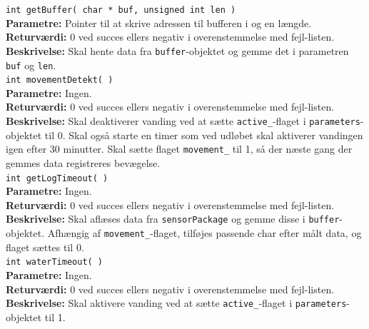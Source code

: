 \verb+int getBuffer( char * buf, unsigned int len )+ \\
\textbf{Parametre:} Pointer til at skrive adressen til bufferen i og en længde. \\
\textbf{Returværdi:} 0 ved succes ellers negativ i overenstemmelse med fejl-listen. \\
\textbf{Beskrivelse:} Skal hente data fra \verb+buffer+-objektet og gemme det i parametren \verb+buf+ og \verb+len+. \\

\verb+int movementDetekt( )+ \\
\textbf{Parametre:} Ingen. \\
\textbf{Returværdi:} 0 ved succes ellers negativ i overenstemmelse med fejl-listen. \\
\textbf{Beskrivelse:} Skal deaktiverer vanding ved at sætte \verb+active_+-flaget i \verb+parameters+-objektet til 0. Skal også starte en timer som ved udløbet skal aktiverer vandingen igen efter 30 minutter. Skal sætte flaget \verb+movement_+ til 1, så der næste gang der gemmes data registreres bevægelse. \\

\verb+int getLogTimeout( )+ \\
\textbf{Parametre:} Ingen. \\
\textbf{Returværdi:} 0 ved succes ellers negativ i overenstemmelse med fejl-listen. \\
\textbf{Beskrivelse:} Skal aflæses data fra \verb+sensorPackage+ og gemme disse i \verb+buffer+-objektet. Afhængig af \verb+movement_+-flaget, tilføjes passende char efter målt data, og flaget sættes til 0. \\

\verb+int waterTimeout( )+ \\
\textbf{Parametre:} Ingen. \\
\textbf{Returværdi:} 0 ved succes ellers negativ i overenstemmelse med fejl-listen. \\
\textbf{Beskrivelse:} Skal aktivere vanding ved at sætte \verb+active_+-flaget i \verb+parameters+-objektet til 1. \\

